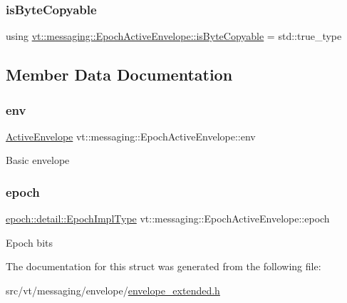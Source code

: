 \subsubsection{\texorpdfstring{is\+Byte\+Copyable}{isByteCopyable}}
{\footnotesize\ttfamily using \hyperlink{structvt_1_1messaging_1_1_epoch_active_envelope_acc191b9182733db346b508d4c77c2e58}{vt\+::messaging\+::\+Epoch\+Active\+Envelope\+::is\+Byte\+Copyable} =  std\+::true\+\_\+type}



\subsection{Member Data Documentation}
\mbox{\label{structvt_1_1messaging_1_1_epoch_active_envelope_aba54092b517b6ade61d737d78aed8d3e}} 
\subsubsection{\texorpdfstring{env}{env}}
{\footnotesize\ttfamily \hyperlink{structvt_1_1messaging_1_1_active_envelope}{Active\+Envelope} vt\+::messaging\+::\+Epoch\+Active\+Envelope\+::env}

Basic envelope \mbox{\label{structvt_1_1messaging_1_1_epoch_active_envelope_a1859d12e89072e39caba3615df85cada}} 
\subsubsection{\texorpdfstring{epoch}{epoch}}
{\footnotesize\ttfamily \hyperlink{namespacevt_1_1epoch_1_1detail_a9adc5df96a521e516dc20511eb553075}{epoch\+::detail\+::\+Epoch\+Impl\+Type} vt\+::messaging\+::\+Epoch\+Active\+Envelope\+::epoch}

Epoch bits 

The documentation for this struct was generated from the following file\+:\begin{DoxyCompactItemize}
\item 
src/vt/messaging/envelope/\hyperlink{envelope__extended_8h}{envelope\+\_\+extended.\+h}\end{DoxyCompactItemize}
